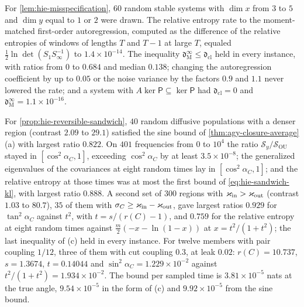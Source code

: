 \begin{numcheck}\label{chk:hie-latent}
For \cref{lem:hie-misspecification}, $60$ random stable systems with $\dim x$ from $3$ to $5$ and $\dim y$ equal to $1$ or $2$ were drawn. The relative entropy rate to the moment-matched first-order autoregression, computed as the difference of the relative entropies of windows of lengths $T$ and $T-1$ at large $T$, equaled $\frac12\ln\det(S_1S_\infty^{-1})$ to $1.4\times10^{-14}$. The inequality $\mathfrak d^\infty_{\mathrm M}\le\mathfrak d_{\mathrm{cl}}$ held in every instance, with ratios from $0$ to $0.684$ and median $0.138$; changing the autoregression coefficient by up to $0.05$ or the noise variance by the factors $0.9$ and $1.1$ never lowered the rate; and a system with $A\ker\mathsf P\subseteq\ker\mathsf P$ had $\mathfrak d_{\mathrm{cl}}=0$ and $\mathfrak d^\infty_{\mathrm M}=1.1\times10^{-16}$.

For \cref{prop:hie-reversible-sandwich}, $40$ random diffusive populations with a denser region (contrast $2.09$ to $29.1$) satisfied the sine bound of \cref{thm:agy-closure-average}(a) with largest ratio $0.822$. On $401$ frequencies from $0$ to $10^4$ the ratio $\mathcal S_y/\mathcal S_{\mathrm{OU}}$ stayed in $[\cos^2\alpha_C,1]$, exceeding $\cos^2\alpha_C$ by at least $3.5\times10^{-8}$; the generalized eigenvalues of the covariances at eight random times lay in $[\cos^2\alpha_C,1]$; and the relative entropy at those times was at most the first bound of \eqref{eq:hie-sandwich-kl}, with largest ratio $0.888$. A second set of $300$ regions with $\varkappa_{\mathrm{in}}>\varkappa_{\mathrm{out}}$ (contrast $1.03$ to $80.7$), $35$ of them with $\sigma_C\ge\varkappa_{\mathrm{in}}-\varkappa_{\mathrm{out}}$, gave largest ratios $0.929$ for $\tan^2\alpha_C$ against $t^2$, with $t=s/(r(C)-1)$, and $0.759$ for the relative entropy at eight random times against $\frac m2(-x-\ln(1-x))$ at $x=t^2/(1+t^2)$; the last inequality of (c) held in every instance. For twelve members with pair coupling $1/12$, three of them with cut coupling $0.3$, at leak $0.02$: $r(C)=10.737$, $s=1.3674$, $t=0.14044$ and $\sin^2\alpha_C=1.229\times10^{-2}$ against $t^2/(1+t^2)=1.934\times10^{-2}$. The bound per sampled time is $3.81\times10^{-5}$ nats at the true angle, $9.54\times10^{-5}$ in the form of (c) and $9.92\times10^{-5}$ from the sine bound.
\end{numcheck}

